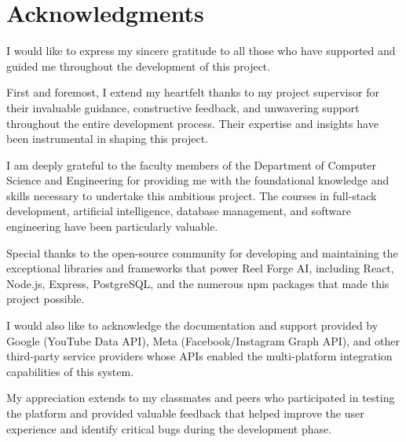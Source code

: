 \chapter*{Acknowledgments}

\vspace{1cm}

I would like to express my sincere gratitude to all those who have supported and guided me throughout the development of this project.

\vspace{0.5cm}

First and foremost, I extend my heartfelt thanks to my project supervisor for their invaluable guidance, constructive feedback, and unwavering support throughout the entire development process. Their expertise and insights have been instrumental in shaping this project.

\vspace{0.5cm}

I am deeply grateful to the faculty members of the Department of Computer Science and Engineering for providing me with the foundational knowledge and skills necessary to undertake this ambitious project. The courses in full-stack development, artificial intelligence, database management, and software engineering have been particularly valuable.

\vspace{0.5cm}

Special thanks to the open-source community for developing and maintaining the exceptional libraries and frameworks that power Reel Forge AI, including React, Node.js, Express, PostgreSQL, and the numerous npm packages that made this project possible.

\vspace{0.5cm}

I would also like to acknowledge the documentation and support provided by Google (YouTube Data API), Meta (Facebook/Instagram Graph API), and other third-party service providers whose APIs enabled the multi-platform integration capabilities of this system.

\vspace{0.5cm}

My appreciation extends to my classmates and peers who participated in testing the platform and provided valuable feedback that helped improve the user experience and identify critical bugs during the development phase.

\vspace{0.5cm}

